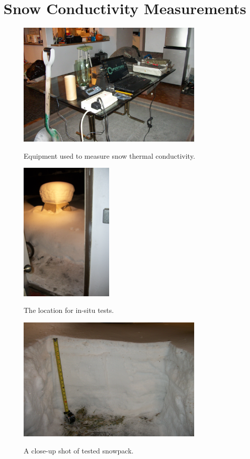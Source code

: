 \section{Snow Conductivity Measurements}
\begin{figure}[h]
\centering
\includegraphics[width=0.8\textwidth]{fig/equipment.jpg}
\label{fig:equipment}
\caption{Equipment used to measure snow thermal conductivity.}
\end{figure}

\begin{figure}[h]
\centering
\includegraphics[width=0.4\textwidth]{fig/insitu_location.jpg}
\label{fig:insitu_location}
\caption{The location for in-situ tests.}
\end{figure}

\begin{figure}[h]
\centering
\includegraphics[width=0.8\textwidth]{fig/snowpack.jpg}
\label{fig:snowpack}
\caption{A close-up shot of tested snowpack.}
\end{figure}

